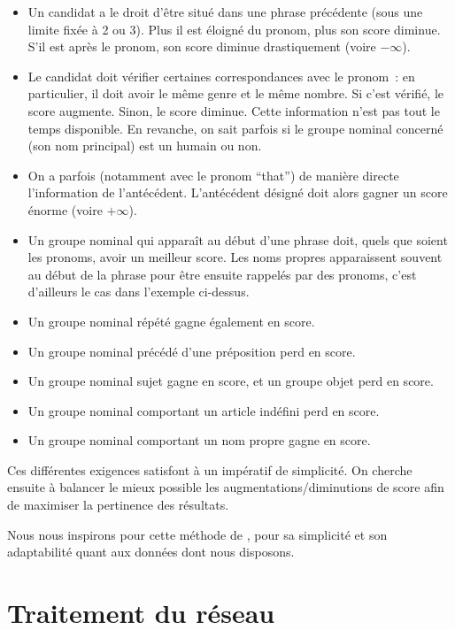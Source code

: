 \documentclass[a4paper, 12pt]{article}
\begin{document}
\begin{itemize}
 \item Un candidat a le droit d'être situé dans une phrase précédente (sous une limite fixée à 2 ou 3). Plus il est éloigné du pronom, plus son score diminue. S'il est après le pronom, son score diminue drastiquement (voire $-\infty$).
 \item Le candidat doit vérifier certaines correspondances avec le pronom~: en particulier, il doit avoir le même genre et le même nombre. Si c'est vérifié, le score augmente. Sinon, le score diminue. Cette information n'est pas tout le temps disponible. En revanche, on sait parfois si le groupe nominal concerné (son nom principal) est un humain ou non.
 \item On a parfois (notamment avec le pronom ``that'') de manière directe l'information de l'antécédent. L'antécédent désigné doit alors gagner un score énorme (voire $+\infty$).
 \item Un groupe nominal qui apparaît au début d'une phrase doit, quels que soient les pronoms, avoir un meilleur score. Les noms propres apparaissent souvent au début de la phrase pour être ensuite rappelés par des pronoms, c'est d'ailleurs le cas dans l'exemple ci-dessus.
 \item Un groupe nominal répété gagne également en score.
 \item Un groupe nominal précédé d'une préposition perd en score.
 \item Un groupe nominal sujet gagne en score, et un groupe objet perd en score. 
 \item Un groupe nominal comportant un article indéfini perd en score.
 \item Un groupe nominal comportant un nom propre gagne en score.
\end{itemize}

Ces différentes exigences satisfont à un impératif de simplicité. On cherche ensuite à balancer le mieux possible les augmentations/diminutions de score afin de maximiser la pertinence des résultats.

Nous nous inspirons pour cette méthode de \cite{Mitkov:1998:RPR:980691.980712}, pour sa simplicité et son adaptabilité quant aux données dont nous disposons.


\section{Traitement du réseau}\label{Section:Traitement}
\end{document}
